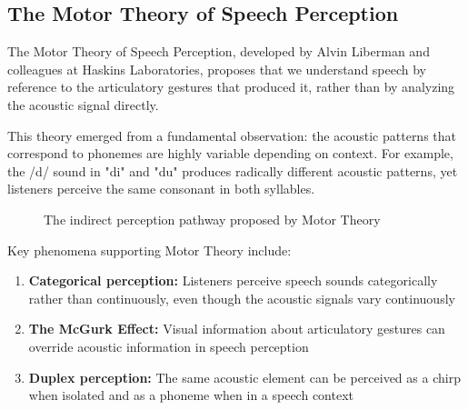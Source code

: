 \documentclass[12pt,a4paper]{article}
\begin{document}
\subsection{The Motor Theory of Speech Perception}

The Motor Theory of Speech Perception, developed by Alvin Liberman and colleagues at Haskins Laboratories, proposes that we understand speech by reference to the articulatory gestures that produced it, rather than by analyzing the acoustic signal directly.

This theory emerged from a fundamental observation: the acoustic patterns that correspond to phonemes are highly variable depending on context. For example, the /d/ sound in "di" and "du" produces radically different acoustic patterns, yet listeners perceive the same consonant in both syllables.

\begin{figure}[h]
\centering
{}
\caption{The indirect perception pathway proposed by Motor Theory}
\label{fig:motor_theory}
\end{figure}

Key phenomena supporting Motor Theory include:

\begin{enumerate}
\item \textbf{Categorical perception:} Listeners perceive speech sounds categorically rather than continuously, even though the acoustic signals vary continuously
\item \textbf{The McGurk Effect:} Visual information about articulatory gestures can override acoustic information in speech perception
\item \textbf{Duplex perception:} The same acoustic element can be perceived as a chirp when isolated and as a phoneme when in a speech context
\end{enumerate}
\end{document}
